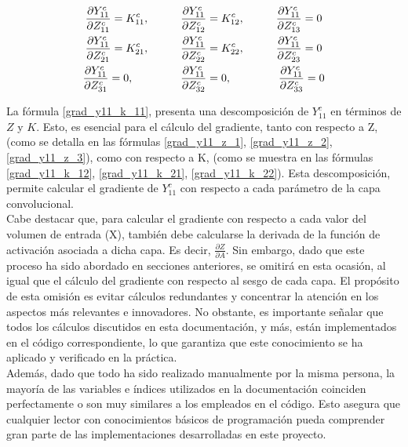 \begin{gather}
	\frac{\partial Y^c_{11}}{\partial Z^c_{11}} = K^c_{11}, \hspace{10mm} \frac{\partial Y^c_{11}}{\partial Z^c_{12}} = K^c_{12}, \hspace{10mm} \frac{\partial Y^c_{11}}{\partial Z^c_{13}} = 0 \label{grad_y11_z_1} \\
	\frac{\partial Y^c_{11}}{\partial Z^c_{21}} = K^c_{21}, \hspace{10mm} \frac{\partial Y^c_{11}}{\partial Z^c_{22}} = K^c_{22}, \hspace{10mm} \frac{\partial Y^c_{11}}{\partial Z^c_{23}} = 0 \label{grad_y11_z_2} \\
	\frac{\partial Y^c_{11}}{\partial Z^c_{31}} = 0, \hspace{15mm} \frac{\partial Y^c_{11}}{\partial Z^c_{32}} = 0, \hspace{15mm} \frac{\partial Y^c_{11}}{\partial Z^c_{33}} = 0 \label{grad_y11_z_3}
\end{gather}

La fórmula \ref{grad_y11_k_11}, presenta una descomposición de $Y^c_{11}$ en términos de $Z$ y $K$. Esto, es esencial para el cálculo del gradiente, tanto con respecto a Z, (como se detalla en las fórmulas \ref{grad_y11_z_1}, \ref{grad_y11_z_2}, \ref{grad_y11_z_3}), como con respecto a K, (como se muestra en las fórmulas \ref{grad_y11_k_12}, \ref{grad_y11_k_21}, \ref{grad_y11_k_22}). Esta descomposición, permite calcular el gradiente de $Y^c_{11}$ con respecto a cada parámetro de la capa convolucional. \\
Cabe destacar que, para calcular el gradiente con respecto a cada valor del volumen de entrada (X), también debe calcularse la derivada de la función de activación asociada a dicha capa. Es decir, $\frac{\partial Z}{\partial A}$. Sin embargo, dado que este proceso ha sido abordado en secciones anteriores, se omitirá en esta ocasión, al igual que el cálculo del gradiente con respecto al sesgo de cada capa. El propósito de esta omisión es evitar cálculos redundantes y concentrar la atención en los aspectos más relevantes e innovadores. No obstante, es importante señalar que todos los cálculos discutidos en esta documentación, y más, están implementados en el código correspondiente, lo que garantiza que este conocimiento se ha aplicado y verificado en la práctica. \\
Además, dado que todo ha sido realizado manualmente por la misma persona, la mayoría de las variables e índices utilizados en la documentación coinciden perfectamente o son muy similares a los empleados en el código. Esto asegura que cualquier lector con conocimientos básicos de programación pueda comprender gran parte de las implementaciones desarrolladas en este proyecto.

